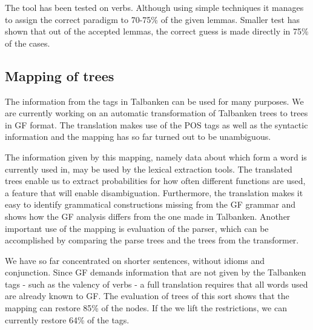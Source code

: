 \documentclass[submission]{eptcs} %
\begin{document}
The tool has been tested on verbs. Although using simple techniques it 
manages to assign the correct paradigm to 70-75\% of the given lemmas.
Smaller test has shown that out of the accepted lemmas, the correct guess is
made directly in 75\% of the cases. 



\subsection{Mapping of trees}
The information from the tags in Talbanken can be used for many purposes.
We are currently working on an automatic transformation of Talbanken trees 
to trees in GF format. The translation makes use of the POS tags as well as
the syntactic information and the mapping has so far turned out to be unambiguous. 

The information given by this mapping, namely data about which form a word is
currently used in, may be used by the lexical extraction
tools.%
The translated trees enable us to extract probabilities for how often
different functions are used, a feature that will enable disambiguation.
Furthermore, the translation makes it easy to identify grammatical constructions
missing from the GF grammar and shows how the GF analysis differs from the one made
in Talbanken.
Another important use of the mapping is evaluation of the parser, which can be
accomplished by comparing the parse trees and the trees from the transformer.

We have so far concentrated on shorter sentences, without idioms and
conjunction. 
Since GF demands information 
that are not given by the Talbanken tags - such as the valency of verbs - a
full translation requires that all words used are already known to GF. 
The evaluation of trees of this sort shows that the mapping
can restore 85\% of the nodes. 
If the we lift the restrictions, we can currently restore 64\% of the tags.
\end{document}
